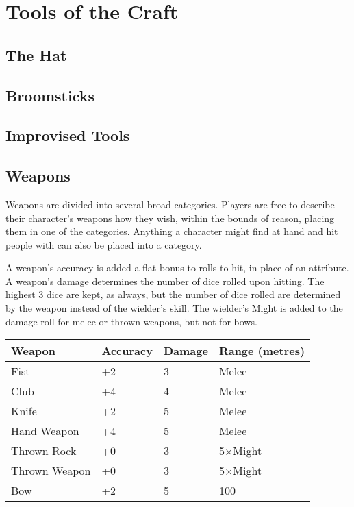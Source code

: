 \chapter{Tools of the Craft}

\section{The Hat}

\section{Broomsticks}

\section{Improvised Tools}

\section{Weapons}

Weapons are divided into several broad categories.
Players are free to describe their character's weapons how they wish, within the bounds of reason, placing them in one of the categories.
Anything a character might find at hand and hit people with can also be placed into a category.

A weapon's accuracy is added a flat bonus to rolls to hit, in place of an attribute.
A weapon's damage determines the number of dice rolled upon hitting.
The highest 3 dice are kept, as always, but the number of dice rolled are determined by the weapon instead of the wielder's skill.
The wielder's Might is added to the damage roll for melee or thrown weapons, but not for bows.

\begin{center}
	\begin{tabu}{X[2.4]XXX[1.2]}
		\toprule
		Weapon & Accuracy & Damage & Range (metres)\\
		\midrule
		Fist & +2 & 3 & Melee\\
		Club & +4 & 4 & Melee\\
		Knife & +2 & 5 & Melee\\
		Hand Weapon & +4 & 5 & Melee\\
		Thrown Rock & +0 & 3 & 5$\times$Might\\
		Thrown Weapon & +0 & 3 & 5$\times$Might\\
		Bow & +2 & 5 & 100\\
		\bottomrule
	\end{tabu}
\end{center}

